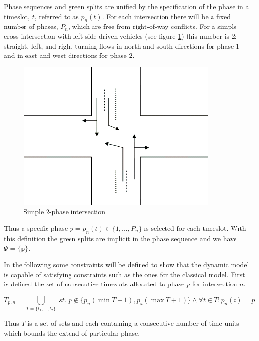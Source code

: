 Phase sequences and green splits are unified by the specification of the phase in a timeslot, $t$, referred to as $p_n(t)$. For each intersection there will be a fixed number of phases, $P_n$, which are free from right-of-way conflicts. For a simple cross intersection with left-side driven vehicles (see figure \ref{fig:simple_intersection}) this number is 2: straight, left, and right turning flows in north and south directions for phase 1 and in east and west directions for phase 2.

\begin{figure}[!ht]
\begin{center}
\includegraphics[scale=0.4]{simple_intersection.png} 
\end{center}
\caption{Simple 2-phase intersection}
\label{fig:simple_intersection}
\end{figure}

Thus a specific phase $p = p_n(t) \in \lbrace 1,...,P_n \rbrace$ is selected for each timeslot. With this definition the green splits are implicit in the phase sequence and we have $\Psi = \lbrace \textbf{p} \rbrace $.

In the following some constraints will be defined to show that the dynamic model is capable of satisfying constraints such as the ones for the classical model. First is defined the set of consecutive timeslots allocated to phase $p$ for intersection $n$:

\begin{equation}
T_{p,n} = \bigcup_{T = \lbrace t_1,...,t_2 \rbrace} \; st. \; p \not \in \lbrace p_n(\min T - 1), p_n(\max T + 1) \rbrace \wedge\forall t \in T: p_n(t) = p 
\end{equation}

Thus $T$ is a set of sets and each containing a consecutive number of time units which bounds the extend of particular phase.

